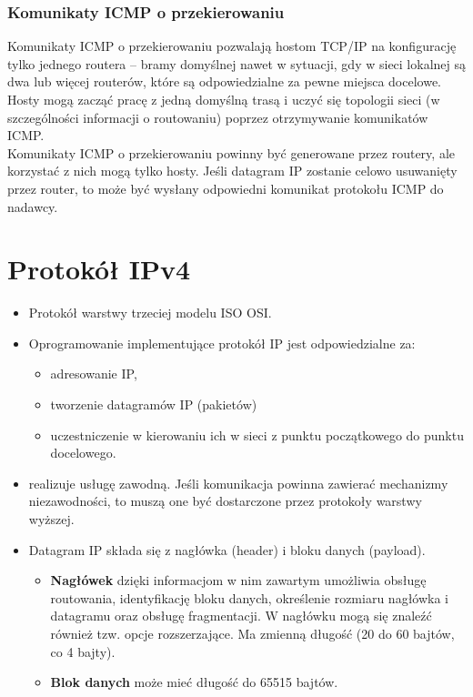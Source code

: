 \documentclass[a4paper]{article}
\begin{document}
\subsubsection{Komunikaty ICMP o przekierowaniu}
Komunikaty ICMP o przekierowaniu pozwalają hostom TCP/IP na konfigurację tylko jednego
routera – bramy domyślnej nawet w sytuacji, gdy w sieci lokalnej są dwa lub więcej
routerów, które są odpowiedzialne za pewne miejsca docelowe.
Hosty mogą zacząć pracę z jedną domyślną trasą i uczyć się topologii sieci (w szczególności
informacji o routowaniu) poprzez otrzymywanie komunikatów ICMP.\\

Komunikaty ICMP o przekierowaniu powinny być generowane przez routery, ale korzystać z
nich mogą tylko hosty.
Jeśli datagram IP zostanie celowo usuwanięty przez router, to może być wysłany odpowiedni komunikat protokołu ICMP do nadawcy.


\section{Protokół IPv4}
\begin{itemize}
    \item Protokół warstwy trzeciej modelu ISO OSI.
    \item Oprogramowanie implementujące protokół IP jest odpowiedzialne za:
    \begin{itemize}
        \item adresowanie IP,
        \item tworzenie datagramów IP (pakietów)
        \item uczestniczenie w kierowaniu ich w sieci z punktu początkowego do punktu docelowego.
    \end{itemize}
    \item realizuje usługę zawodną. Jeśli komunikacja powinna zawierać mechanizmy niezawodności, to muszą one być dostarczone przez protokoły warstwy wyższej.
    \item Datagram IP składa się z nagłówka (header) i bloku danych (payload).
    \begin{itemize}
        \item \textbf{Nagłówek} dzięki informacjom w nim zawartym umożliwia obsługę routowania, identyfikację bloku danych, określenie rozmiaru nagłówka i datagramu oraz obsługę fragmentacji. W nagłówku mogą się znaleźć również tzw. opcje rozszerzające. Ma zmienną długość (20 do 60 bajtów, co 4 bajty).
        \item \textbf{Blok danych} może mieć długość do 65515 bajtów.
    \end{itemize}
\end{itemize}
\end{document}
